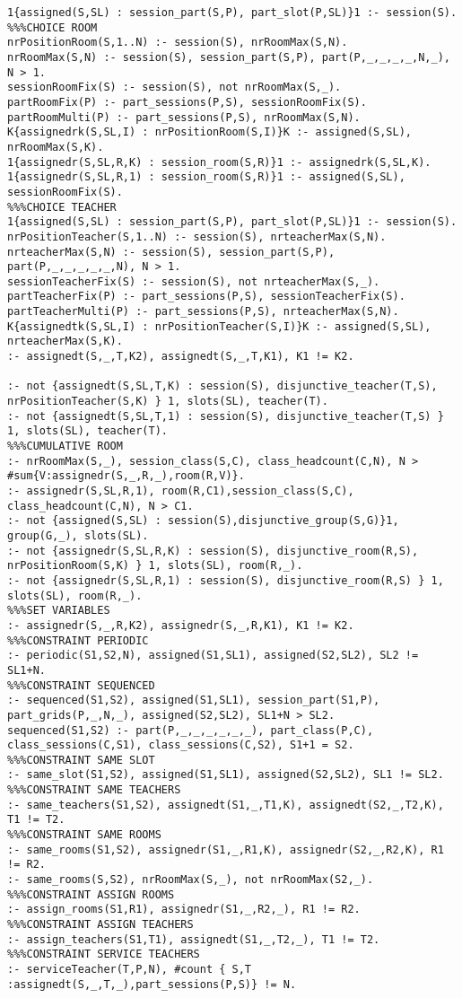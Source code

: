 \begin{lstlisting}[style=PrologStyle, caption={ASP model}, label={lst:model-asp}]
1{assigned(S,SL) : session_part(S,P), part_slot(P,SL)}1 :- session(S).
%%%CHOICE ROOM
nrPositionRoom(S,1..N) :- session(S), nrRoomMax(S,N).
nrRoomMax(S,N) :- session(S), session_part(S,P), part(P,_,_,_,_,N,_), N > 1.
sessionRoomFix(S) :- session(S), not nrRoomMax(S,_).
partRoomFix(P) :- part_sessions(P,S), sessionRoomFix(S).
partRoomMulti(P) :- part_sessions(P,S), nrRoomMax(S,N).
K{assignedrk(S,SL,I) : nrPositionRoom(S,I)}K :- assigned(S,SL), nrRoomMax(S,K).
1{assignedr(S,SL,R,K) : session_room(S,R)}1 :- assignedrk(S,SL,K).
1{assignedr(S,SL,R,1) : session_room(S,R)}1 :- assigned(S,SL), sessionRoomFix(S).
%%%CHOICE TEACHER
1{assigned(S,SL) : session_part(S,P), part_slot(P,SL)}1 :- session(S).
nrPositionTeacher(S,1..N) :- session(S), nrteacherMax(S,N).
nrteacherMax(S,N) :- session(S), session_part(S,P), part(P,_,_,_,_,_,N), N > 1.
sessionTeacherFix(S) :- session(S), not nrteacherMax(S,_).
partTeacherFix(P) :- part_sessions(P,S), sessionTeacherFix(S).
partTeacherMulti(P) :- part_sessions(P,S), nrteacherMax(S,N).
K{assignedtk(S,SL,I) : nrPositionTeacher(S,I)}K :- assigned(S,SL), nrteacherMax(S,K).
:- assignedt(S,_,T,K2), assignedt(S,_,T,K1), K1 != K2.

:- not {assignedt(S,SL,T,K) : session(S), disjunctive_teacher(T,S), nrPositionTeacher(S,K) } 1, slots(SL), teacher(T).
:- not {assignedt(S,SL,T,1) : session(S), disjunctive_teacher(T,S) } 1, slots(SL), teacher(T).
%%%CUMULATIVE ROOM
:- nrRoomMax(S,_), session_class(S,C), class_headcount(C,N), N > #sum{V:assignedr(S,_,R,_),room(R,V)}.
:- assignedr(S,SL,R,1), room(R,C1),session_class(S,C), class_headcount(C,N), N > C1.
:- not {assigned(S,SL) : session(S),disjunctive_group(S,G)}1, group(G,_), slots(SL).
:- not {assignedr(S,SL,R,K) : session(S), disjunctive_room(R,S), nrPositionRoom(S,K) } 1, slots(SL), room(R,_).
:- not {assignedr(S,SL,R,1) : session(S), disjunctive_room(R,S) } 1, slots(SL), room(R,_).
%%%SET VARIABLES
:- assignedr(S,_,R,K2), assignedr(S,_,R,K1), K1 != K2.
%%%CONSTRAINT PERIODIC
:- periodic(S1,S2,N), assigned(S1,SL1), assigned(S2,SL2), SL2 != SL1+N.
%%%CONSTRAINT SEQUENCED
:- sequenced(S1,S2), assigned(S1,SL1), session_part(S1,P), part_grids(P,_,N,_), assigned(S2,SL2), SL1+N > SL2.
sequenced(S1,S2) :- part(P,_,_,_,_,_,_), part_class(P,C), class_sessions(C,S1), class_sessions(C,S2), S1+1 = S2.
%%%CONSTRAINT SAME SLOT
:- same_slot(S1,S2), assigned(S1,SL1), assigned(S2,SL2), SL1 != SL2.
%%%CONSTRAINT SAME TEACHERS
:- same_teachers(S1,S2), assignedt(S1,_,T1,K), assignedt(S2,_,T2,K), T1 != T2.
%%%CONSTRAINT SAME ROOMS
:- same_rooms(S1,S2), assignedr(S1,_,R1,K), assignedr(S2,_,R2,K), R1 != R2.
:- same_rooms(S,S2), nrRoomMax(S,_), not nrRoomMax(S2,_).
%%%CONSTRAINT ASSIGN ROOMS
:- assign_rooms(S1,R1), assignedr(S1,_,R2,_), R1 != R2.
%%%CONSTRAINT ASSIGN TEACHERS
:- assign_teachers(S1,T1), assignedt(S1,_,T2,_), T1 != T2.
%%%CONSTRAINT SERVICE TEACHERS
:- serviceTeacher(T,P,N), #count { S,T :assignedt(S,_,T,_),part_sessions(P,S)} != N.
\end{lstlisting}

